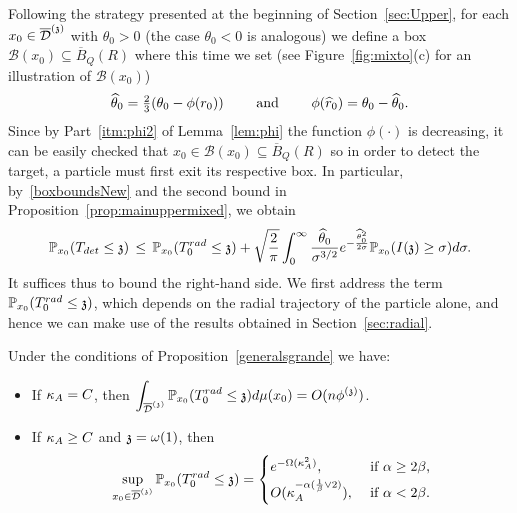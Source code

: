 Following the strategy presented at the beginning of Section~\ref{sec:Upper}, for each $x_0\in\ndt$ with $\theta_0>0$ (the case $\theta_0<0$ is analogous) we define a box $\mathcal{B}(x_0)\subseteq \overline{B}_Q(R)$ where this time we set (see Figure~\ref{fig:mixto}(c) for an illustration of $\mathcal{B}(x_0)$)
\begin{equation}\label{def:hatthatr}
\hatt=\tfrac{2}{3}(\theta_0-\phi(r_0))\qquad\text{ and }\qquad \phi(\hatr)=\theta_0-\hatt.
\end{equation}
Since by Part~\eqref{itm:phi2} of Lemma~\ref{lem:phi} the function $\phi(\cdot)$ is decreasing, it can be easily checked that $x_0\in\mathcal{B}(x_0)\subseteq \overline{B}_Q(R)$ so in order to detect the target, a particle must first exit its respective box.
In particular, by~\eqref{boxboundsNew} and the second bound in Proposition~\ref{prop:mainuppermixed}, we obtain
\begin{equation}\label{eq:mainupper1}\PP_{x_0}(T_{det}\leq \ss)\,\leq\,\PP_{x_0}(\trad\leq \ss)+\sqrt{\frac{2}{\pi}}\int_{0}^{\infty}\frac{\hatt}{\sigma^{3/2}}e^{-\frac{\hatt^2}{2\sigma}}\PP_{x_0}(\II{\ss}\geq\sigma)d\sigma.\end{equation}
It suffices thus to bound the right-hand side. We first address the term $\PP_{x_0}(\trad\leq \ss)$, which depends on the radial trajectory of the particle alone, and hence we can make use of the results obtained in Section~\ref{sec:radial}. 
\begin{proposition}\label{generalschicorad}
Under the conditions of Proposition~\ref{generalsgrande} we have:
\begin{itemize}
    \item If $\KA=C$, then
    $\displaystyle\int_{\ndt}\P_{x_0}(\trad\leq \ss)d\mu(x_0) 
=O(n\phis)$.
\item If $\KA\geq C$ and $\ss=\omega(1)$, then
\[
\sup_{x_0\in\ndt}\P_{x_0}(\trad\leq \ss) =
\begin{cases}
e^{-\Omega(\KA^2)},
& \text{ if $\alpha\geq2\beta$,} \\[2pt]
O(\KA^{-\alpha(\frac{1}{\beta}\vee 2)}),
& \text{ if $\alpha<2\beta$.} 
\end{cases}
\]
\end{itemize}
\end{proposition}
